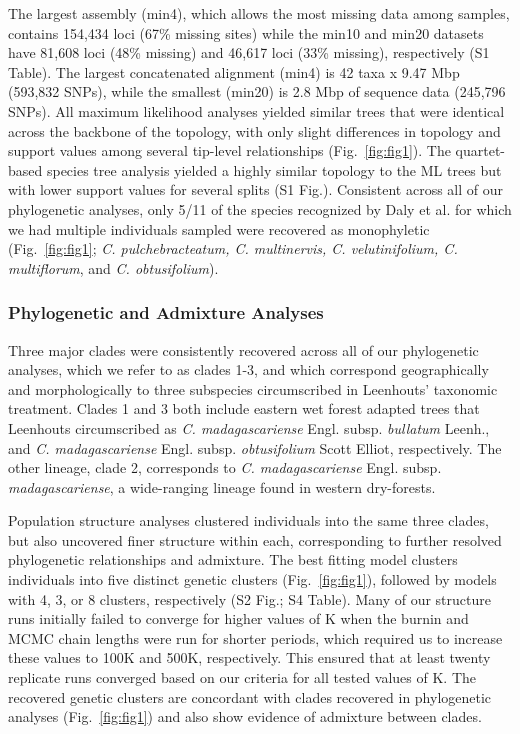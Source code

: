 \documentclass[10pt,letterpaper]{article}
\begin{document}
The largest assembly (min4), which allows the most missing data among samples, contains 154,434 loci (67\% missing sites) while the min10 and min20 datasets have 81,608 loci (48\% missing) and 46,617 loci (33\% missing), respectively (S1 Table). %
The largest concatenated alignment (min4) is 42 taxa x 9.47 Mbp (593,832 SNPs), while the smallest (min20) is 2.8 Mbp of sequence data (245,796 SNPs). All maximum likelihood analyses yielded similar trees that were identical across the backbone of the topology, with only slight differences in topology and support values among several tip-level relationships (Fig.~\ref{fig:fig1}). The quartet-based species tree analysis yielded a highly similar topology to the ML trees but with lower support values for several splits (S1 Fig.). %
Consistent across all of our phylogenetic analyses, only 5/11 of the species recognized by Daly et al. \cite{daly_revision_2015} for which we had multiple individuals sampled were recovered as monophyletic (Fig.~\ref{fig:fig1}; \emph{C. pulchebracteatum, C. multinervis, C. velutinifolium, C. multiflorum}, and \emph{C. obtusifolium}).

\subsubsection*{Phylogenetic and Admixture Analyses}
Three major clades were consistently recovered across all of our phylogenetic analyses, which we refer to as clades 1-3, and which correspond geographically and morphologically to three subspecies circumscribed in Leenhouts' \cite{leenhouts_revision_1959} taxonomic treatment. Clades 1 and 3 both include eastern wet forest adapted trees that Leenhouts circumscribed as \emph{C. madagascariense} Engl. subsp. \emph{bullatum} Leenh., and \emph{C. madagascariense} Engl. subsp. \emph{obtusifolium} Scott Elliot, respectively. The other lineage, clade 2, corresponds to \emph{C. madagascariense} Engl. subsp. \emph{madagascariense}, a wide-ranging lineage found in western dry-forests. 

Population structure analyses clustered individuals into the same three clades, but also uncovered finer structure within each, corresponding to further resolved phylogenetic relationships and admixture. The best fitting model clusters individuals into five distinct genetic clusters (Fig.~\ref{fig:fig1}), followed by models with 4, 3, or 8 clusters, respectively
(S2 Fig.; %
S4 Table). %
Many of our structure runs initially failed to converge for higher values of K when the burnin and MCMC chain lengths were run for shorter periods, which required us to increase these values to 100K and 500K, respectively. This ensured that at least twenty replicate runs converged based on our criteria for all tested values of K. The recovered genetic clusters are concordant with clades recovered in phylogenetic analyses (Fig.~\ref{fig:fig1}) and also show evidence of admixture between clades.
\end{document}
